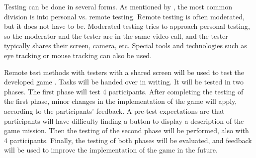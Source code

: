 Testing can be done in several forms.
As mentioned by \cite{moran_2019_usability}, the most common division is into personal vs. remote testing.
Remote testing is often moderated, but it does not have to be.
Moderated testing tries to approach personal testing, so the moderator and the tester are in the same video call, and the tester typically shares their screen, camera, etc.
Special tools and technologies such as eye tracking or mouse tracking can also be used.

Remote test methods with testers with a shared screen will be used to test the developed game \myAppName{}.
Tasks will be handed over in writing.
It will be tested in two phases.
The first phase will test 4 participants.
After completing the testing of the first phase, minor changes in the implementation of the game will apply, according to the participants' feedback.
A pre-test expectations are that participants will have difficulty finding a button to display a description of the game mission.
Then the testing of the second phase will be performed, also with 4 participants.
Finally, the testing of both phases will be evaluated, and feedback will be used to improve the implementation of the game in the future.
